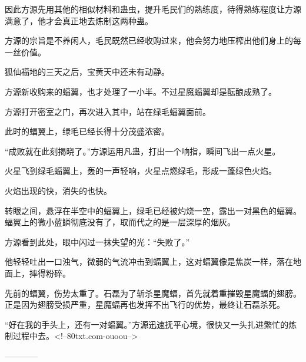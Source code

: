 \begin{this_body}
因此方源先用其他的相似材料和蛊虫，提升毛民们的熟练度，待得熟练程度让方源满意了，他才会真正地去炼制这两种蛊。

方源的宗旨是不养闲人，毛民既然已经收购过来，他会努力地压榨出他们身上的每一丝价值。

狐仙福地的三天之后，宝黄天中还未有动静。

方源新收购来的蝠翼，也才处理了一小半。不过星魔蝠翼却是酝酿成熟了。

方源打开密室之门，再次进入其中，站在绿毛蝠翼面前。

此时的蝠翼上，绿毛已经长得十分茂盛浓密。

“成败就在此刻揭晓了。”方源运用凡蛊，打出一个响指，瞬间飞出一点火星。

火星飞到绿毛蝠翼上，轰的一声轻响，火星点燃绿毛，形成一蓬绿色火焰。

火焰出现的快，消失的也快。

转眼之间，悬浮在半空中的蝠翼上，绿毛已经被灼烧一空，露出一对黑色的蝠翼。蝠翼上的微小蓝鳞彻底没有了，取而代之的是一层深厚的烟灰。

方源看到此处，眼中闪过一抹失望的光：“失败了。”

他轻轻吐出一口浊气，微弱的气流冲击到蝠翼上，这对蝠翼像是焦炭一样，落在地面上，摔得粉碎。

先前的蝠翼，伤势太重了。石磊为了斩杀星魔蝠，首先就着重摧毁星魔蝠的翅膀。正是因为翅膀受损严重，星魔蝠再也发挥不出飞行的优势，最终让石磊杀死。

“好在我的手头上，还有一对蝠翼。”方源迅速抚平心境，很快又一头扎进繁忙的炼制过程中去。<!--80txt.com-ouoou-->

------------

\end{this_body}

